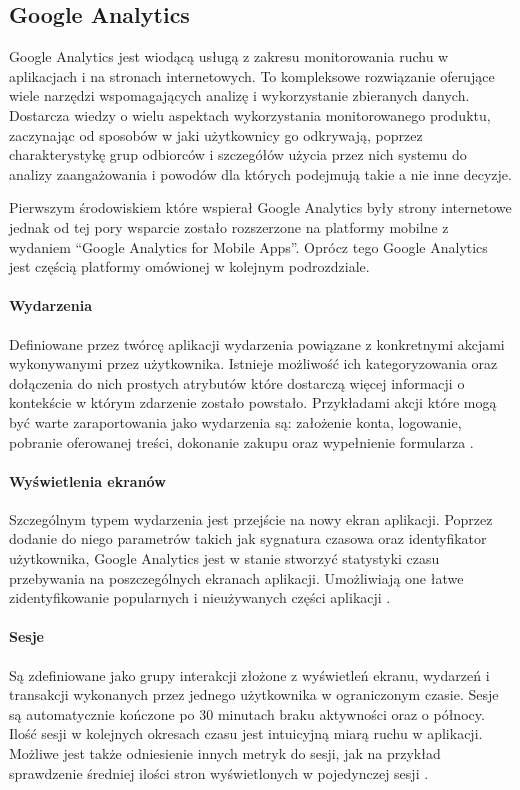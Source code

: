 \subsection{Google Analytics}
\label{sec:ga}
Google Analytics jest wiodącą usługą z zakresu monitorowania ruchu w aplikacjach i na stronach internetowych. To kompleksowe rozwiązanie oferujące wiele narzędzi wspomagających analizę i wykorzystanie zbieranych danych. Dostarcza wiedzy o wielu aspektach wykorzystania monitorowanego produktu, zaczynając od sposobów w jaki użytkownicy go odkrywają, poprzez charakterystykę grup odbiorców i szczegółów użycia przez nich systemu do analizy zaangażowania i powodów dla których podejmują takie a nie inne decyzje.

Pierwszym środowiskiem które wspierał Google Analytics były strony internetowe jednak od tej pory wsparcie zostało rozszerzone na platformy mobilne z wydaniem ``Google Analytics for Mobile Apps''. Oprócz tego Google Analytics jest częścią platformy  omówionej w kolejnym podrozdziale.


\paragraph{Wydarzenia}
\label{par:ga-events}
Definiowane przez twórcę aplikacji wydarzenia powiązane z konkretnymi akcjami wykonywanymi przez użytkownika. Istnieje możliwość ich kategoryzowania oraz dołączenia do nich prostych atrybutów które dostarczą więcej informacji o kontekście w którym zdarzenie zostało powstało. Przykładami akcji które mogą być warte zaraportowania jako wydarzenia są: założenie konta, logowanie, pobranie oferowanej treści, dokonanie zakupu oraz wypełnienie formularza \cite{GA_Events}.

\paragraph{Wyświetlenia ekranów}
Szczególnym typem wydarzenia jest przejście na nowy ekran aplikacji. Poprzez dodanie do niego parametrów takich jak sygnatura czasowa oraz identyfikator użytkownika, Google Analytics jest w stanie stworzyć statystyki czasu przebywania na poszczególnych ekranach aplikacji. Umożliwiają one łatwe zidentyfikowanie popularnych i nieużywanych części aplikacji \cite{GA_Pages}.

\paragraph{Sesje}
Są zdefiniowane jako grupy interakcji złożone z wyświetleń ekranu, wydarzeń i transakcji wykonanych przez jednego użytkownika w ograniczonym czasie. Sesje są automatycznie kończone po 30 minutach braku aktywności oraz o północy. Ilość sesji w kolejnych okresach czasu jest intuicyjną miarą ruchu w aplikacji. Możliwe jest także odniesienie innych metryk do sesji, jak na przykład sprawdzenie średniej ilości stron wyświetlonych w pojedynczej sesji \cite{GA_Sessions}.

